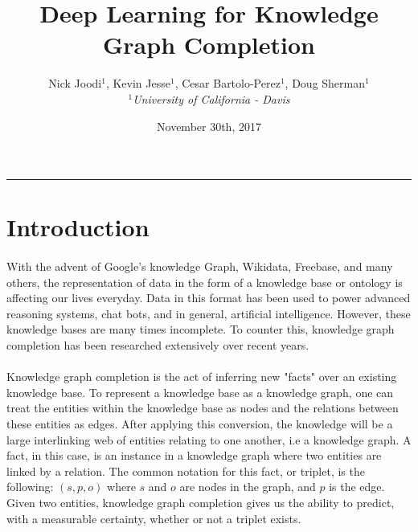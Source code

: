 \documentclass[11.5pt]{article}
\begin{document}
\title{Deep Learning for Knowledge Graph Completion}
\author{Nick Joodi$^1$, Kevin Jesse$^1$, Cesar Bartolo-Perez$^1$, Doug Sherman$^1$\\
	{\small
	\textit{$^1$University of California - Davis}}
} 
\date{November 30th, 2017}
\maketitle
\rule{\textwidth}{1pt}

\begin{abstract}

\end{abstract}

\tableofcontents

\section{Introduction}
\paragraph{} With the advent of Google's knowledge Graph, Wikidata, Freebase, and many others, the representation of data in the form of a knowledge base or ontology is affecting our lives everyday. Data in this format has been used to power advanced reasoning systems, chat bots, and in general, artificial intelligence. However, these knowledge bases are many times incomplete. To counter this, knowledge graph completion has been researched extensively over recent years. 

\paragraph{} Knowledge graph completion is the act of inferring new "facts" over an existing knowledge base. To represent a knowledge base as a knowledge graph, one can treat the entities within the knowledge base as nodes and the relations between these entities as edges. After applying this conversion, the knowledge will be a large interlinking web of entities relating to one another, i.e a knowledge graph. A fact, in this case, is an instance in a knowledge graph where two entities are linked by a relation. The common notation for this fact, or triplet, is the following:  $(s,p,o) $ where $s$ and $o$ are nodes in the graph, and $p$ is the edge. Given two entities, knowledge graph completion gives us the ability to predict, with a measurable certainty, whether or not a triplet exists.
\end{document}
